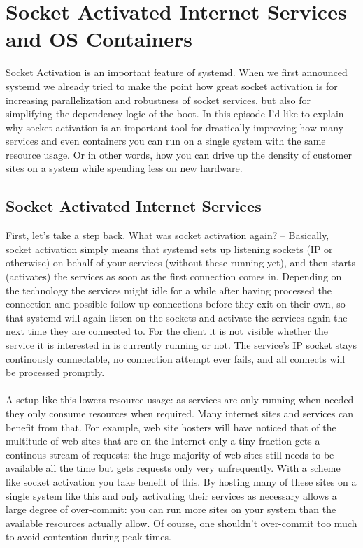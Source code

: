 \documentclass[titlepage]{article}
\begin{document}
\section{Socket Activated Internet Services and OS Containers}
Socket Activation is an important feature of systemd. When we first announced systemd we already tried to make the point how great socket activation is for increasing parallelization and robustness of socket services, but also for simplifying the dependency logic of the boot. In this episode I'd like to explain why socket activation is an important tool for drastically improving how many services and even containers you can run on a single system with the same resource usage. Or in other words, how you can drive up the density of customer sites on a system while spending less on new hardware.
\subsection{Socket Activated Internet Services}
First, let's take a step back. What was socket activation again? -- Basically, socket activation simply means that systemd sets up listening sockets (IP or otherwise) on behalf of your services (without these running yet), and then starts (activates) the services as soon as the first connection comes in. Depending on the technology the services might idle for a while after having processed the connection and possible follow-up connections before they exit on their own, so that systemd will again listen on the sockets and activate the services again the next time they are connected to. For the client it is not visible whether the service it is interested in is currently running or not. The service's IP socket stays continously connectable, no connection attempt ever fails, and all connects will be processed promptly.
\\
\\
A setup like this lowers resource usage: as services are only running when needed they only consume resources when required. Many internet sites and services can benefit from that. For example, web site hosters will have noticed that of the multitude of web sites that are on the Internet only a tiny fraction gets a continous stream of requests: the huge majority of web sites still needs to be available all the time but gets requests only very unfrequently. With a scheme like socket activation you take benefit of this. By hosting many of these sites on a single system like this and only activating their services as necessary allows a large degree of over-commit: you can run more sites on your system than the available resources actually allow. Of course, one shouldn't over-commit too much to avoid contention during peak times.
\end{document}
